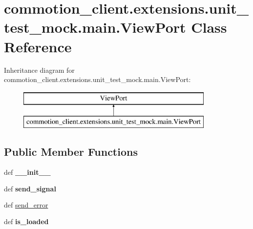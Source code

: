 \hypertarget{classcommotion__client_1_1extensions_1_1unit__test__mock_1_1main_1_1ViewPort}{\section{commotion\+\_\+client.\+extensions.\+unit\+\_\+test\+\_\+mock.\+main.\+View\+Port Class Reference}
\label{classcommotion__client_1_1extensions_1_1unit__test__mock_1_1main_1_1ViewPort}
}
Inheritance diagram for commotion\+\_\+client.\+extensions.\+unit\+\_\+test\+\_\+mock.\+main.\+View\+Port\+:\begin{figure}[H]
\begin{center}
\leavevmode
\includegraphics[height=2.000000cm]{classcommotion__client_1_1extensions_1_1unit__test__mock_1_1main_1_1ViewPort}
\end{center}
\end{figure}
\subsection*{Public Member Functions}
\begin{DoxyCompactItemize}
\item 
\hypertarget{classcommotion__client_1_1extensions_1_1unit__test__mock_1_1main_1_1ViewPort_aee1f7a0c54f76a72ad9161a600173b62}{def {\bfseries \+\_\+\+\_\+init\+\_\+\+\_\+}}\label{classcommotion__client_1_1extensions_1_1unit__test__mock_1_1main_1_1ViewPort_aee1f7a0c54f76a72ad9161a600173b62}

\item 
\hypertarget{classcommotion__client_1_1extensions_1_1unit__test__mock_1_1main_1_1ViewPort_a448314ebfe5a2dd40088ba107598e420}{def {\bfseries send\+\_\+signal}}\label{classcommotion__client_1_1extensions_1_1unit__test__mock_1_1main_1_1ViewPort_a448314ebfe5a2dd40088ba107598e420}

\item 
def \hyperlink{classcommotion__client_1_1extensions_1_1unit__test__mock_1_1main_1_1ViewPort_a2f7a09774f0ed12d8588104e76e04027}{send\+\_\+error}
\item 
\hypertarget{classcommotion__client_1_1extensions_1_1unit__test__mock_1_1main_1_1ViewPort_a4889467cc323053dd9a5c2c018ce2843}{def {\bfseries is\+\_\+loaded}}\label{classcommotion__client_1_1extensions_1_1unit__test__mock_1_1main_1_1ViewPort_a4889467cc323053dd9a5c2c018ce2843}

\end{DoxyCompactItemize}
